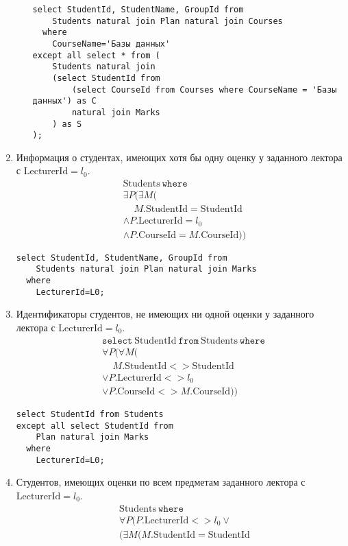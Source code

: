 \documentclass{article}
\newcommand{\Students}{\mathrm{Students}}
\newcommand{\StudentId}{\mathrm{StudentId}}
\newcommand{\CourseId}{\mathrm{CourseId}}
\newcommand{\LecturerId}{\mathrm{LecturerId}}
\newcommand{\select}{\mathtt{select}~}
\newcommand{\from}{~\mathtt{from}~}
\newcommand{\where}{~\mathtt{where}~}
\begin{document}
\begin{enumerate}
\begin{enumerate}
\begin{verbatim}
select StudentId, StudentName, GroupId from
    Students natural join Plan natural join Courses
  where
    CourseName='Базы данных'
except all select * from (
    Students natural join
    (select StudentId from
        (select CourseId from Courses where CourseName = 'Базы данных') as C
        natural join Marks
    ) as S
);
    \end{verbatim}
    \end{enumerate}
    \item Информация о студентах, имеющих хотя бы одну оценку у заданного
        лектора с $\LecturerId=l_0$.
    \begin{align*}
        &\Students \where \\
        & \exists P (\exists M ( \\
        &\mathbin{\phantom{\land}} M.\StudentId = \StudentId \\
        &\land P.\LecturerId = l_0 \\
        &\land P.\CourseId = M.\CourseId))
    \end{align*}
    \begin{verbatim}
select StudentId, StudentName, GroupId from
    Students natural join Plan natural join Marks
  where
    LecturerId=L0;
    \end{verbatim}
    \item Идентификаторы студентов, не имеющих ни одной оценки у заданного
        лектора с $\LecturerId=l_0$.
    \begin{align*}
        &\select \StudentId \from \Students \where \\
        & \forall P (\forall M ( \\
        &\mathbin{\phantom{\lor}} M.\StudentId <> \StudentId \\
        &\lor P.\LecturerId <> l_0 \\
        &\lor P.\CourseId <> M.\CourseId))
    \end{align*}
    \begin{verbatim}
select StudentId from Students
except all select StudentId from
    Plan natural join Marks
  where
    LecturerId=L0;
    \end{verbatim}
    \item Студентов, имеющих оценки по всем предметам заданного
        лектора с $\LecturerId=l_0$.
    \begin{align*}
        &\Students \where \\
        & \forall P (P.\LecturerId <> l_0 \lor \\
        &(\exists M (M.\StudentId = \StudentId

\end{align*}
\end{enumerate}
\end{document}
